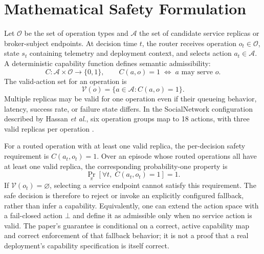 \documentclass[conference]{IEEEtran}
\begin{document}
\section{Mathematical Safety Formulation}
Let $\mathcal{O}$ be the set of operation types and $\mathcal{A}$ the set of candidate service replicas or broker-subject endpoints. At decision time $t$, the router receives operation $o_t\in\mathcal{O}$, state $s_t$ containing telemetry and deployment context, and selects action $a_t\in\mathcal{A}$. A deterministic capability function defines semantic admissibility:
\begin{equation}
C: \mathcal{A}\times\mathcal{O}\rightarrow\{0,1\},
\qquad
C(a,o)=1 \;\Longleftrightarrow\; a \text{ may serve } o.
\label{eq:capability}
\end{equation}
The valid-action set for an operation is
\begin{equation}
\mathcal{V}(o)=\{a\in\mathcal{A}:C(a,o)=1\}.
\label{eq:validset}
\end{equation}
Multiple replicas may be valid for one operation even if their queueing behavior, latency, success rate, or failure state differs. In the SocialNetwork configuration described by Hassan \emph{et al.}, six operation groups map to 18 actions, with three valid replicas per operation \cite{hassan2026}.

For a routed operation with at least one valid replica, the per-decision safety requirement is $C(a_t,o_t)=1$. Over an episode whose routed operations all have at least one valid replica, the corresponding probability-one property is
\begin{equation}
\Pr_{\pi}\!\left[\forall t,\; C(a_t,o_t)=1\right]=1.
\label{eq:safety}
\end{equation}
If $\mathcal{V}(o_t)=\varnothing$, selecting a service endpoint cannot satisfy this requirement. The safe decision is therefore to reject or invoke an explicitly configured fallback, rather than infer a capability. Equivalently, one can extend the action space with a fail-closed action $\bot$ and define it as admissible only when no service action is valid. The paper's guarantee is conditional on a correct, active capability map and correct enforcement of that fallback behavior; it is not a proof that a real deployment's capability specification is itself correct.
\end{document}
